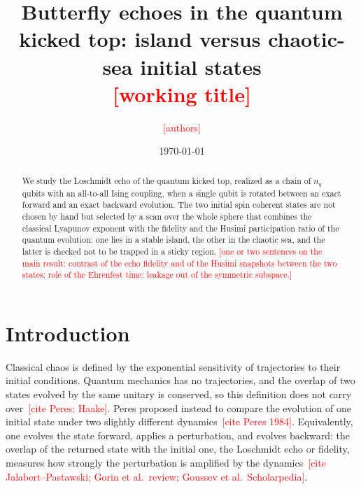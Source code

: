 \documentclass[aps,pra,twocolumn,superscriptaddress,nofootinbib]{revtex4-2}
\newcommand{\PH}[1]{\textcolor{red}{[\textsf{#1}]}}
\newcommand{\nq}{n_q}                      %
\begin{document}
\title{Butterfly echoes in the quantum kicked top: island versus chaotic-sea initial states\\
  \PH{working title}}

\author{\PH{authors}}
\affiliation{\PH{affiliations}}

\date{\today}

\begin{abstract}
We study the Loschmidt echo of the quantum kicked top, realized as a chain of $\nq$ qubits with an all-to-all Ising
coupling, when a single qubit is rotated between an exact forward and an exact backward evolution. The two initial
spin coherent states are not chosen by hand but selected by a scan over the whole sphere that combines the classical
Lyapunov exponent with the fidelity and the Husimi participation ratio of the quantum evolution: one lies in a stable
island, the other in the chaotic sea, and the latter is checked not to be trapped in a sticky region. \PH{one or two
sentences on the main result: contrast of the echo fidelity and of the Husimi snapshots between the two states; role
of the Ehrenfest time; leakage out of the symmetric subspace.}
\end{abstract}

\maketitle

\section{Introduction}\label{sec:intro}

Classical chaos is defined by the exponential sensitivity of trajectories to their initial conditions. Quantum
mechanics has no trajectories, and the overlap of two states evolved by the same unitary is conserved, so this
definition does not carry over~\PH{cite Peres; Haake}. Peres proposed instead to compare the evolution of one initial
state under two slightly different dynamics~\PH{cite Peres 1984}. Equivalently, one evolves the state forward, applies
a perturbation, and evolves backward: the overlap of the returned state with the initial one, the Loschmidt
echo or fidelity, measures how strongly the perturbation is amplified by the dynamics~\PH{cite Jalabert--Pastawski;
Gorin et al.\ review; Goussev et al.\ Scholarpedia}.
\end{document}
